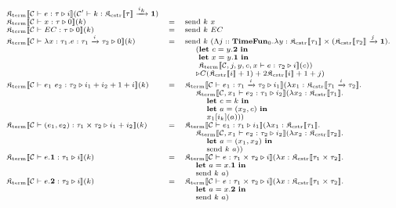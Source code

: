 \documentclass[fleqn]{article}
\begin{document}
\[
\scriptsize
\begin{array}{lcl}
	\cpst{\jty{\mathcal{C}}{e}{\tau}{i}}{\jtyc{\mathcal{C}'}{k}{\cpsc{\tau} \xrightarrow{i_k} \mathbf{1}}} \\
	\cpst{\jty{\mathcal{C}}{x}{\tau}{0}}{k} & = & \mathrm{send}~k~x \\
	\cpst{\jty{\mathcal{C}}{EC}{\tau}{0}}{k} & = & \mathrm{send}~k~EC \\
	\cpst{\jty{\mathcal{C}}{\lambda x : \tau_1. e}{\tau_1 \xrightarrow{i} \tau_2}{0}}{k} & = & \mathrm{send}~k~(\Lambda j :: \mathbf{TimeFun}_0. \lambda y : \cpsc{\tau_1} \times (\cpsc{\tau_2} \xrightarrow{j} \mathbf{1}). \\
	& & ~~~~ (\mathbf{let}~c=y.\mathbf{2}~\mathbf{in} \\
	& & ~~~~~ \mathbf{let}~x=y.\mathbf{1}~\mathbf{in} \\
	& & ~~~~~ \cpst{\jty{\mathcal{C},j,y,c,x}{e}{\tau_2}{i}}{c}) \\
	& & ~~~~ \triangleright {C(\cpsc{i}+1)+2\cpsc{i}+1+j} ) \\
	\cpst{\jty{\mathcal{C}}{e_1~e_2}{\tau_2}{i_1+i_2+1+i}}{k} & = & \cpst{\jty{\mathcal{C}}{e_1}{\tau_1 \xrightarrow{i} \tau_2}{i_1}}{\lambda x_1 : \cpsc{\tau_1 \xrightarrow{i} \tau_2}. \\
	& & ~~~~ \cpst{\jty{\mathcal{C},x_1}{e_2}{\tau_1}{i_2}}{\lambda x_2:\cpsc{\tau_1}. \\
	& & ~~~~~~~~ \mathbf{let}~c = k~\mathbf{in} \\
	& & ~~~~~~~~ \mathbf{let}~a = (x_2,c)~\mathbf{in} \\
	& & ~~~~~~~~ x_1[i_k](a) } } \\
	\cpst{\jty{\mathcal{C}}{(e_1,e_2)}{\tau_1 \times \tau_2}{i_1+i_2}}{k} & = & \cpst{\jty{\mathcal{C}}{e_1}{\tau_1}{i_1}}{\lambda x_1 : \cpsc{\tau_1}. \\
	& & ~~~~ \cpst{\jty{\mathcal{C},x_1}{e_2}{\tau_2}{i_2}}{\lambda x_2 : \cpsc{\tau_2}. \\
	& & ~~~~~~~~ \mathbf{let}~a=(x_1,x_2)~\mathbf{in} \\
	& & ~~~~~~~~ \mathrm{send}~k~a } } \\
	\cpst{\jty{\mathcal{C}}{e.\mathbf{1}}{\tau_1}{i}}{k} & = & \cpst{\jty{\mathcal{C}}{e}{\tau_1 \times \tau_2}{i}}{\lambda x : \cpsc{\tau_1 \times \tau_2}. \\
	& & ~~~~ \mathbf{let}~a=x.\mathbf{1}~\mathbf{in} \\
	& & ~~~~ \mathrm{send}~k~a } \\
	\cpst{\jty{\mathcal{C}}{e.\mathbf{2}}{\tau_2}{i}}{k} & = & \cpst{\jty{\mathcal{C}}{e}{\tau_1 \times \tau_2}{i}}{\lambda x : \cpsc{\tau_1 \times \tau_2}. \\
	& & ~~~~ \mathbf{let}~a=x.\mathbf{2}~\mathbf{in} \\
	& & ~~~~ \mathrm{send}~k~a }
\end{array}
\]
\end{document}
